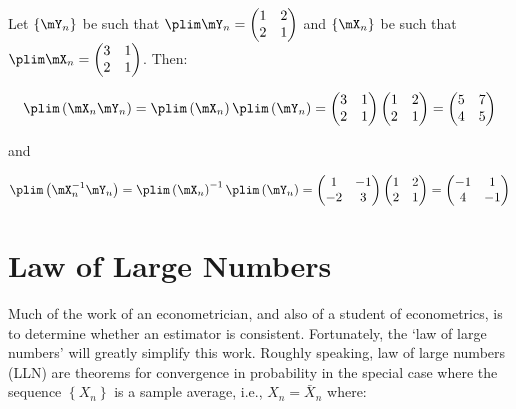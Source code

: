 \documentclass[english,12pt]{book}\usepackage[]{graphicx}\usepackage[]{xcolor}
\begin{document}
\begin{example}
Let $\left\lbrace \mY_n \right\rbrace$ be such that $\plim \mY_n = \begin{pmatrix} 1 & 2 \\ 2 & 1 \end{pmatrix}$ and $\left\lbrace \mX_n \right\rbrace$ be such that $\plim \mX_n = \begin{pmatrix} 3 & 1 \\ 2 & 1 \end{pmatrix}$. Then:

\begin{equation*}
\plim \left(\mX_n\mY_n\right) = \plim\left(\mX_n\right)\plim \left(\mY_n\right) = \begin{pmatrix} 3 & 1 \\ 2 & 1 \end{pmatrix}\begin{pmatrix} 1 & 2 \\ 2 & 1 \end{pmatrix} =  \begin{pmatrix} 5 & 7 \\ 4 & 5 \end{pmatrix}
\end{equation*}

and

\begin{equation*}
\plim \left(\mX_n^{-1}\mY_n\right) = \plim\left(\mX_n\right)^{-1}\plim \left(\mY_n\right) = \begin{pmatrix} 1 & -1 \\ -2 & 3 \end{pmatrix}\begin{pmatrix} 1 & 2 \\ 2 & 1 \end{pmatrix} =  \begin{pmatrix} -1 & 1 \\ 4 & -1 \end{pmatrix}
\end{equation*}
\end{example}


\section{Law of Large Numbers}

Much of the work of an econometrician, and also of a student of econometrics, is to determine whether an estimator is consistent. Fortunately, the `law of large numbers' will greatly simplify this work. Roughly speaking, law of large numbers (LLN) are theorems for convergence in probability in the special case where the sequence $\left\lbrace X_n \right\rbrace$ is a sample average, i.e., $X_n = \bar{X}_n$ where:
\end{document}
